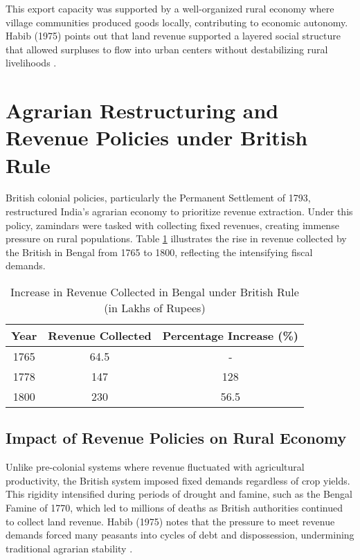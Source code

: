 \documentclass[9pt,twocolumn,twoside]{opticajnl}
\begin{document}
This export capacity was supported by a well-organized rural economy where village communities produced goods locally, contributing to economic autonomy. Habib (1975) points out that land revenue supported a layered social structure that allowed surpluses to flow into urban centers without destabilizing rural livelihoods \cite{habib1975colonization}.

\section{Agrarian Restructuring and Revenue Policies under British Rule}
British colonial policies, particularly the Permanent Settlement of 1793, restructured India’s agrarian economy to prioritize revenue extraction. Under this policy, zamindars were tasked with collecting fixed revenues, creating immense pressure on rural populations. Table \ref{table:revenue_increase} illustrates the rise in revenue collected by the British in Bengal from 1765 to 1800, reflecting the intensifying fiscal demands.

\begin{table}[h!]
\centering
\begin{tabular}{|c|c|c|}
\hline
\textbf{Year} & \textbf{Revenue Collected} & \textbf{Percentage Increase (\%)} \\
\hline
1765 & 64.5 & - \\
1778 & 147 & 128 \\
1800 & 230 & 56.5 \\
\hline
\end{tabular}
\caption{Increase in Revenue Collected in Bengal under British Rule (in Lakhs of Rupees)}
\label{table:revenue_increase}
\end{table}

\subsection{Impact of Revenue Policies on Rural Economy}
Unlike pre-colonial systems where revenue fluctuated with agricultural productivity, the British system imposed fixed demands regardless of crop yields. This rigidity intensified during periods of drought and famine, such as the Bengal Famine of 1770, which led to millions of deaths as British authorities continued to collect land revenue. Habib (1975) notes that the pressure to meet revenue demands forced many peasants into cycles of debt and dispossession, undermining traditional agrarian stability \cite{habib1975colonization}.
\end{document}
